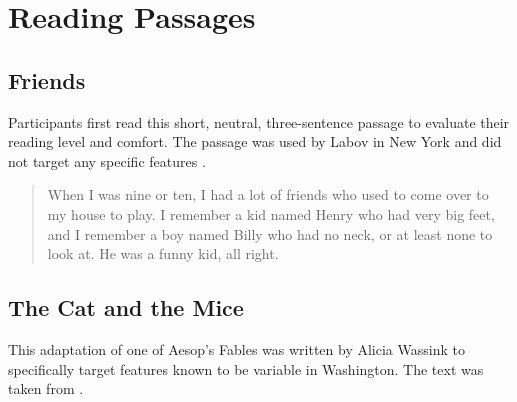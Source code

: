 \chapter{Reading Passages}
\label{appendix:reading_passages}

\section{Friends}

Participants first read this short, neutral, three-sentence passage to evaluate their reading level and comfort. The passage was used by Labov in New York and did not target any specific features \citep[417]{labov_2006}.

\begin{quotation}
    When I was nine or ten, I had a lot of friends who used to come over to my house to play. I remember a kid named Henry who had very big feet, and I remember a boy named Billy who had no neck, or at least none to look at. He was a funny kid, all right.
\end{quotation}

\section{The Cat and the Mice}

This adaptation of one of Aesop's Fables was written by Alicia Wassink to specifically target features known to be variable in Washington. The text was taken from \citet{freeman_2014}.

